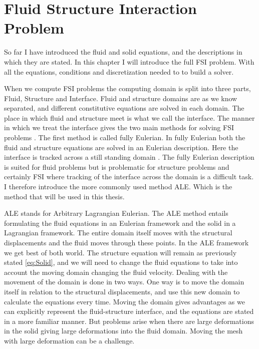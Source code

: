 \chapter{Fluid Structure Interaction Problem}
So far I have introduced the fluid and solid equations, and the descriptions in which they are stated. In this chapter I will introduce the full FSI problem. With all the equations, conditions and discretization needed to to build a solver. \newline

When we compute FSI problems the computing domain is split into three parts, Fluid, Structure and Interface. Fluid and structure domains are as we know separated, and different constitutive equations are solved in each domain. The place in which fluid and structure meet is what we call the interface. The manner in which we treat the interface gives the two main methods for solving FSI problems \cite{Liu2014}. The first method is called fully Eulerian. In fully Eulerian both the fluid and structure equations are solved in an Eulerian description. Here the interface is tracked across a still standing domain \cite{Valkov2015}. The fully Eulerian description is suited for fluid problems but is problematic for structure problems and certainly FSI where tracking of the interface across the domain is a difficult task. I therefore introduce the more commonly used method ALE. Which is the method that will be used in this thesis. \newline

ALE stands for Arbitrary Lagrangian Eulerian. The ALE method entails formulating the fluid equations in an Eulerian framework and the solid in a Lagrangian framework. The entire domain itself moves with the structural displacements and the fluid moves through these points. In the ALE framework we get best of both world. The structure equation will remain as previously stated \eqref{eq:Solid}, and we will need to change the fluid equations to take into account the moving domain changing the fluid velocity. Dealing with the movement of the domain is done in two ways. One way is to move the domain itself in relation to the structural displacements, and use this new domain to calculate the equations every time.
Moving the domain gives advantages as we can explicitly represent the fluid-structure interface, and the equations are stated in a more familiar manner. But problems arise when there are large deformations in the solid giving large deformations into the fluid domain. Moving the mesh with large deformation can be a challenge. \newline

